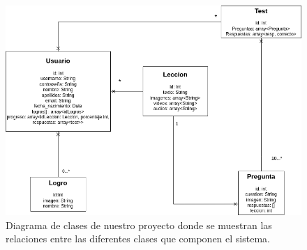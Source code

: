 \begin{figure}[H]
    \centering
    \centerline{\includegraphics[width=1.25\textwidth]{imagenes/c5/diagramadeclases.png}}
    \caption{Diagrama de clases de nuestro proyecto donde se muestran las relaciones entre las diferentes clases que componen el sistema.}
    \label{fig:diagramadeclases}
    
    
\end{figure}